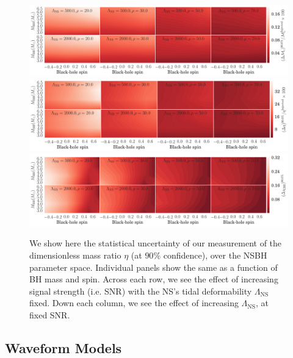 \documentclass[aps,prd,amsmath,floats,floatfix, twocolumn,
superscriptaddress,nofootinbib,showpacs]{revtex4-1}
\newcommand{\lambdans}{\Lambda_\mathrm{NS}}
\begin{document}
\begin{figure}
\centering 
\includegraphics[width=1.9\columnwidth]{plots/TNMchirpCIWidths90_0_Lambda_SNR}\\
\includegraphics[width=1.9\columnwidth]{plots/TNEtaCIWidths90_0_Lambda_SNR}\\
\includegraphics[width=1.9\columnwidth]{plots/TNChiBHCIWidths90_0_Lambda_SNR}
\caption{
We show here the statistical uncertainty of our measurement of the 
dimensionless mass ratio $\eta$ (at $90\%$ confidence), over the NSBH
parameter space.
Individual panels show the same as a function of BH mass and spin.
Across each row, we see the effect of increasing signal strength (i.e.
SNR) with the NS's tidal deformability $\lambdans$ fixed. Down each
column, we see the effect of increasing $\lambdans$, at fixed SNR.
}
\label{fig:CIWidths90_Lambda_SNR}
\end{figure}

\subsection{Waveform Models}\label{s2:waveforms}
\end{document}
